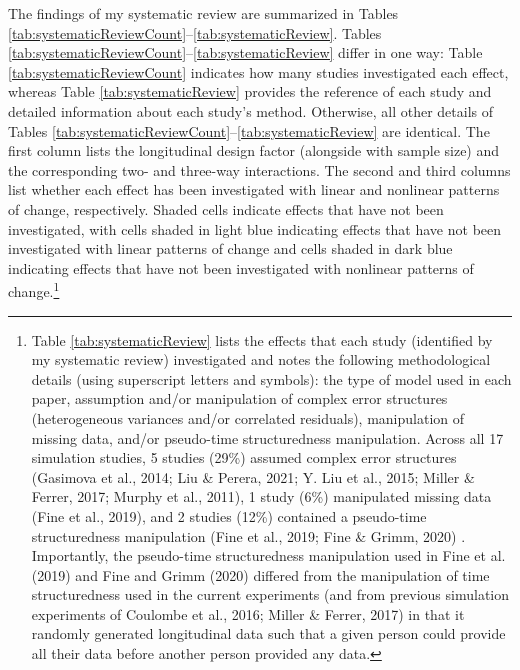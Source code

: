 \documentclass[
  english,
  man,floatsintext]{apa7}
\begin{document}
The findings of my systematic review are summarized in Tables \ref{tab:systematicReviewCount}--\ref{tab:systematicReview}. Tables \ref{tab:systematicReviewCount}--\ref{tab:systematicReview} differ in one way: Table \ref{tab:systematicReviewCount} indicates how many studies investigated each effect, whereas Table \ref{tab:systematicReview} provides the reference of each study and detailed information about each study's method. Otherwise, all other details of Tables \ref{tab:systematicReviewCount}--\ref{tab:systematicReview} are identical. The first column lists the longitudinal design factor (alongside with sample size) and the corresponding two- and three-way interactions. The second and third columns list whether each effect has been investigated with linear and nonlinear patterns of change, respectively. Shaded cells indicate effects that have not been investigated, with cells shaded in light blue indicating effects that have not been investigated with linear patterns of change and cells shaded in dark blue indicating effects that have not been investigated with nonlinear patterns of change.\footnote{Table \ref{tab:systematicReview} lists the effects that each study (identified by my systematic review) investigated and notes the following methodological details (using superscript letters and symbols): the type
of model used in each paper, assumption and/or manipulation of complex error structures
(heterogeneous variances and/or correlated residuals), manipulation of missing data,
and/or pseudo-time structuredness manipulation. Across all 17 simulation studies, 5 studies (29\%) assumed complex error structures (Gasimova et al., 2014; Liu \& Perera, 2021; Y. Liu et al., 2015; Miller \& Ferrer, 2017; Murphy et al., 2011), 1 study (6\%) manipulated missing data (Fine et al., 2019), and 2 studies (12\%) contained a pseudo-time structuredness manipulation (Fine et al., 2019; Fine \& Grimm, 2020) . Importantly, the pseudo-time structuredness manipulation used in Fine et al. (2019) and Fine and Grimm (2020) differed from the manipulation of time
structuredness used in the current experiments (and from previous simulation experiments of Coulombe et al., 2016; Miller \& Ferrer, 2017) in that it randomly generated longitudinal data such that a given person could provide all their data before another person provided any data.}
\end{document}
